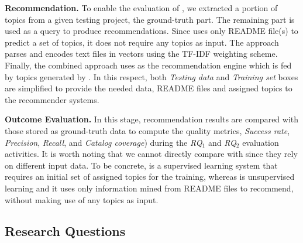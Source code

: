 \vspace{.1cm}
\noindent\textbf{Recommendation.} To enable the evaluation of \TF, we extracted a portion of topics from a given testing project, \ie the ground-truth part. The remaining part is used as a query to produce recommendations. %
Since \MNB uses only README file(s) to predict a set of topics, it does not require any topics as input. The approach parses and encodes text files in vectors using the TF-IDF weighting scheme. 
Finally, the combined approach uses \TF as the recommendation engine which is fed by topics generated by \MNB. In this respect, both \textit{Testing data} and \textit{Training set} boxes are simplified to provide the needed data, \ie README files and assigned topics to the recommender systems.

\vspace{.1cm}
\noindent\textbf{Outcome Evaluation.} In this stage, recommendation results are compared with those stored as ground-truth data to compute the quality metrics, \ie \textit{Success rate}, \textit{Precision}, \textit{Recall}, and \textit{Catalog coverage}) during the \textit{RQ$_1$} and \textit{RQ$_2$} evaluation activities.  
%
It is worth noting that we cannot directly compare \TF with \MNB since they rely on different input data. To be concrete, \TF is a supervised learning system that requires an initial set of assigned topics for the training, whereas \MNB is unsupervised learning and it uses only information mined from README files to recommend, without making use of any topics as input. 




\subsection{Research Questions} \label{sec:ResearchQuestions}

